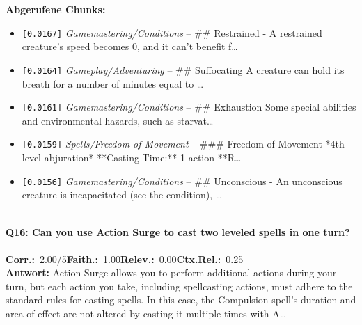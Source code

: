 \noindent\textbf{Abgerufene Chunks:}
\begin{itemize}[noitemsep, topsep=2pt]
  \item[\textbf{\#1}] \texttt{[0.0167]} \textit{Gamemastering/Conditions} -- \#\# Restrained  - A restrained creature's speed becomes 0, and it can't benefit f\ldots
  \item[\textbf{\#2}] \texttt{[0.0164]} \textit{Gameplay/Adventuring} -- \#\# Suffocating  A creature can hold its breath for a number of minutes equal to \ldots
  \item[\textbf{\#3}] \texttt{[0.0161]} \textit{Gamemastering/Conditions} -- \#\# Exhaustion  Some special abilities and environmental hazards, such as starvat\ldots
  \item[\textbf{\#4}] \texttt{[0.0159]} \textit{Spells/Freedom of Movement} -- \#\#\# Freedom of Movement  *4th-level abjuration*  **Casting Time:** 1 action  **R\ldots
  \item[\textbf{\#5}] \texttt{[0.0156]} \textit{Gamemastering/Conditions} -- \#\# Unconscious  - An unconscious creature is incapacitated (see the condition), \ldots
\end{itemize}
\vspace{4pt}
\hrule
\vspace{6pt}

\paragraph{Q16: Can you use Action Surge to cast two leveled spells in one turn?}
\noindent \textbf{Corr.:}~2.00/5\quad \textbf{Faith.:}~1.00\quad \textbf{Relev.:}~0.00\quad \textbf{Ctx.Rel.:}~0.25\\

\noindent\textbf{Antwort:} Action Surge allows you to perform additional actions during your turn, but each action you take, including spellcasting actions, must adhere to the standard rules for casting spells. In this case, the Compulsion spell's duration and area of effect are not altered by casting it multiple times with A\ldots

